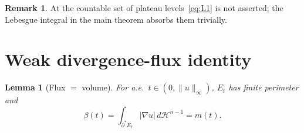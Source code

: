 \documentclass[11pt]{article}
\newtheorem{lemma}[theorem]{Lemma}
\theoremstyle{definition}
\newtheorem{remark}[theorem]{Remark}
\begin{document}
\begin{remark}\label{rem:plateaus}
At the countable set of plateau levels~\eqref{eq:L1} is not asserted; the
Lebesgue integral in the main theorem absorbs them trivially.
\end{remark}

\section{Weak divergence-flux identity}\label{sec:flux}

\begin{lemma}[Flux $=$ volume]\label{lem:flux}
For a.e.\ $t\in(0,\|u\|_{\infty})$, $E_{t}$ has finite perimeter and
\begin{equation}\label{eq:L2}
   \beta(t)=
   \int_{\partial^{*}E_{t}}|\nabla u|\,d\mathcal H^{n-1}
   =m(t).
\end{equation}
\end{lemma}
\end{document}
